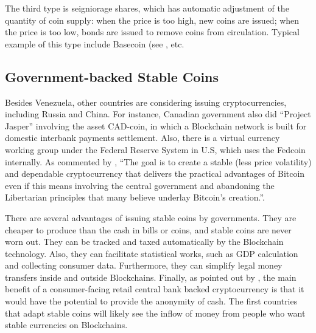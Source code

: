 \documentclass[final,pdftex]{ectaart}
\theoremstyle{plain}
\begin{document}
The third type is seigniorage shares, which has automatic adjustment of the quantity of coin supply: when the price is too high, new coins are issued; when the price is too low, bonds are issued to remove coins from circulation. Typical example of this type include Basecoin (see \cite{al-naji_basecoin:_2018}, etc.

\subsection{Government-backed Stable Coins}

Besides Venezuela, other countries are considering issuing cryptocurrencies, including Russia and China. For instance, Canadian government also did ``Project Jasper'' involving the asset CAD-coin, in which a Blockchain network is built for domestic interbank payments settlement. Also, there is a virtual currency working group under the Federal Reserve System in U.S, which uses the Fedcoin internally. As commented by \cite{garratt_cad-coin_2016}, ``The goal is to create a stable (less price volatility) and dependable cryptocurrency that delivers the practical advantages of Bitcoin even if this means involving the central government and abandoning the Libertarian principles that many believe underlay Bitcoin's creation.''.

There are several advantages of issuing stable coins by governments. They are cheaper to produce than the cash in bills or coins, and stable coins are never worn out. They can be tracked and taxed automatically by the Blockchain technology. Also, they can facilitate statistical works, such as GDP calculation and collecting consumer data. Furthermore, they can simplify legal money transfers inside and outside Blockchains. Finally, as pointed out by \cite{bech_central_2017}, the main benefit of a consumer-facing retail central bank backed cryptocurrency is that it would have the potential to provide the anonymity of cash. The first countries that adapt stable coins will likely see the inflow of money from people who want stable currencies on Blockchains.



\end{document}
